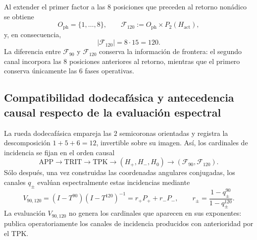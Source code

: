 Al extender el primer factor a las \(8\) posiciones que preceden al retorno
nonádico se obtiene
\[
 O_{\mathrm{ph}}=\{1,\ldots,8\},
 \qquad
 \mathcal F_{120}
 :=O_{\mathrm{ph}}\times P_2(H_{\mathrm{act}}),
\]
y, en consecuencia,
\[
 |\mathcal F_{120}|=8\cdot15=120.
\]
La diferencia entre \(\mathcal F_{90}\) y \(\mathcal F_{120}\) conserva la
información de frontera: el segundo canal incorpora las \(8\) posiciones
anteriores al retorno, mientras que el primero conserva únicamente las
\(6\) fases operativas.

\subsection{Compatibilidad dodecafásica y antecedencia causal respecto de la evaluación espectral}

La rueda dodecafásica empareja las \(2\) semicoronas orientadas y registra la
descomposición \(1+5+6=12\), invertible sobre su imagen. Así, los cardinales
de incidencia se fijan en el orden causal
\[
 \mathrm{APP}\longrightarrow\mathrm{TRIT}\longrightarrow\mathrm{TPK}
 \longrightarrow(H_+,H_-,H_0)
 \longrightarrow(\mathcal F_{90},\mathcal F_{120}).
\]
Sólo después, una vez construidas las coordenadas angulares conjugadas, los
canales \(q_\pm\) evalúan espectralmente estas incidencias mediante
\[
 V_{90,120}
 =(I-T^{90})(I-T^{120})^{-1}
 =r_+P_++r_-P_-,
 \qquad
 r_\pm=\frac{1-q_\pm^{90}}{1-q_\pm^{120}}.
\]
La evaluación \(V_{90,120}\) no genera los cardinales que aparecen en sus
exponentes: publica operatoriamente los canales de incidencia producidos con
anterioridad por el TPK.
